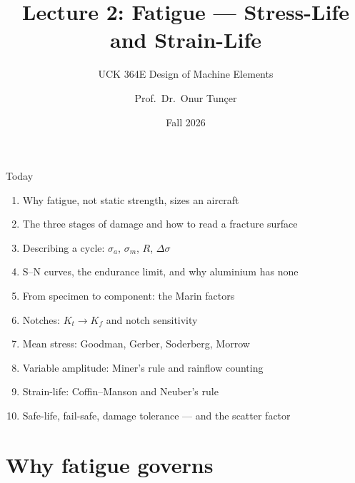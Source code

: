 \documentclass[aspectratio=169,10pt]{beamer}
\title{Lecture 2: Fatigue --- Stress-Life and Strain-Life}
\subtitle{UCK 364E Design of Machine Elements}
\author{Prof.\ Dr.\ Onur Tunçer}
\institute{Department of Aeronautical Engineering, Istanbul Technical University}
\date{Fall 2026}
\begin{document}
\maketitle

\begin{frame}{Today}
\begin{enumerate}
  \item Why fatigue, not static strength, sizes an aircraft
  \item The three stages of damage and how to read a fracture surface
  \item Describing a cycle: $\sigma_a$, $\sigma_m$, $R$, $\Delta\sigma$
  \item S--N curves, the endurance limit, and why aluminium has none
  \item From specimen to component: the Marin factors
  \item Notches: $K_t\to K_f$ and notch sensitivity
  \item Mean stress: Goodman, Gerber, Soderberg, Morrow
  \item Variable amplitude: Miner's rule and rainflow counting
  \item Strain-life: Coffin--Manson and Neuber's rule
  \item Safe-life, fail-safe, damage tolerance --- and the scatter factor
\end{enumerate}
\end{frame}

\section{Why fatigue governs}
\end{document}
